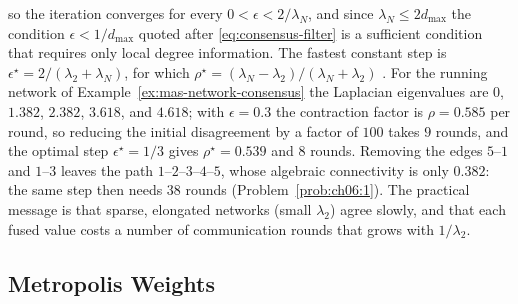 so the iteration converges for every $0<\epsilon<2/\lambda_N$, and since $\lambda_N\le 2d_{\max}$ the condition $\epsilon<1/d_{\max}$ quoted after \eqref{eq:consensus-filter} is a sufficient condition that requires only local degree information. The fastest constant step is $\epsilon^{\star}=2/(\lambda_2+\lambda_N)$, for which $\rho^{\star}=(\lambda_N-\lambda_2)/(\lambda_N+\lambda_2)$ \cite{xiao2004_fast_averaging}. For the running network of Example~\ref{ex:mas-network-consensus} the Laplacian eigenvalues are $0$, $1.382$, $2.382$, $3.618$, and $4.618$; with $\epsilon=0.3$ the contraction factor is $\rho=0.585$ per round, so reducing the initial disagreement by a factor of $100$ takes $9$ rounds, and the optimal step $\epsilon^{\star}=1/3$ gives $\rho^{\star}=0.539$ and $8$ rounds. Removing the edges $5$--$1$ and $1$--$3$ leaves the path $1$--$2$--$3$--$4$--$5$, whose algebraic connectivity is only $0.382$: the same step then needs $38$ rounds (Problem~\ref{prob:ch06:1}). The practical message is that sparse, elongated networks (small $\lambda_2$) agree slowly, and that each fused value costs a number of communication rounds that grows with $1/\lambda_2$.

\subsection{Metropolis Weights}
\label{subsec:mas-metropolis}

